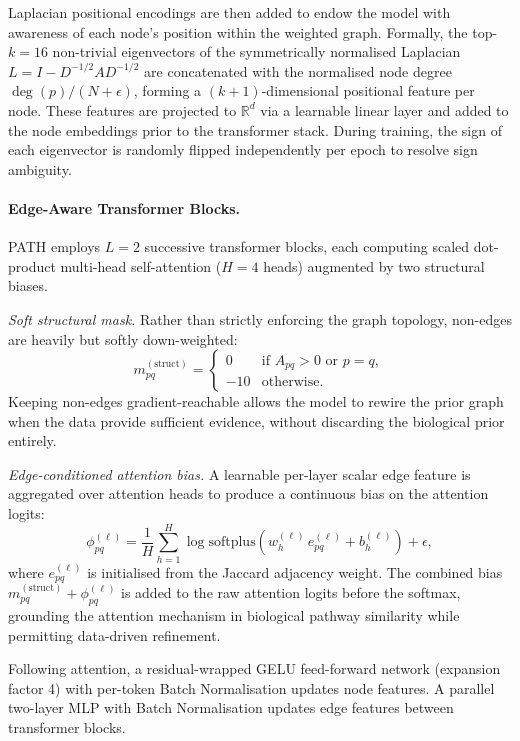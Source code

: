 Laplacian positional encodings are then added to endow the model with awareness of each node's position within the weighted graph. Formally, the top-$k = 16$ non-trivial eigenvectors of the symmetrically normalised Laplacian $L = I - D^{-1/2}AD^{-1/2}$ are concatenated with the normalised node degree $\deg(p)/(N + \epsilon)$, forming a $(k+1)$-dimensional positional feature per node. These features are projected to $\mathbb{R}^d$ via a learnable linear layer and added to the node embeddings prior to the transformer stack. During training, the sign of each eigenvector is randomly flipped independently per epoch to resolve sign ambiguity.

\paragraph{Edge-Aware Transformer Blocks.}
PATH employs $L = 2$ successive transformer blocks, each computing scaled dot-product multi-head self-attention ($H = 4$ heads) augmented by two structural biases.

\emph{Soft structural mask.} Rather than strictly enforcing the graph topology, non-edges are heavily but softly down-weighted:
\begin{equation}
m^{(\text{struct})}_{pq} = \begin{cases} 0 & \text{if } A_{pq} > 0 \text{ or } p = q, \\ -10 & \text{otherwise.} \end{cases}
\end{equation}
Keeping non-edges gradient-reachable allows the model to rewire the prior graph when the data provide sufficient evidence, without discarding the biological prior entirely.

\emph{Edge-conditioned attention bias.} A learnable per-layer scalar edge feature is aggregated over attention heads to produce a continuous bias on the attention logits:
\begin{equation}
\phi^{(\ell)}_{pq} = \frac{1}{H} \sum_{h=1}^{H} \log \text{softplus}\!\left(w^{(\ell)}_h\, e^{(\ell)}_{pq} + b^{(\ell)}_h\right) + \epsilon,
\end{equation}
where $e^{(\ell)}_{pq}$ is initialised from the Jaccard adjacency weight. The combined bias $m^{(\text{struct})}_{pq} + \phi^{(\ell)}_{pq}$ is added to the raw attention logits before the softmax, grounding the attention mechanism in biological pathway similarity while permitting data-driven refinement.

Following attention, a residual-wrapped GELU feed-forward network (expansion factor 4) with per-token Batch Normalisation updates node features. A parallel two-layer MLP with Batch Normalisation updates edge features between transformer blocks.

